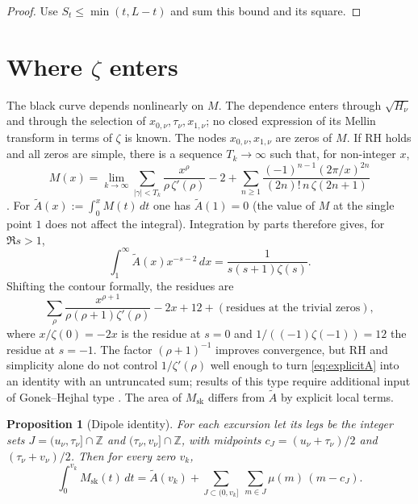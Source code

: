 \documentclass[11pt]{amsart}
\numberwithin{equation}{section}
\theoremstyle{plain}
\newtheorem{proposition}[theorem]{Proposition}
\theoremstyle{definition}
\theoremstyle{remark}
\newcommand{\Msk}{M_{\mathrm{sk}}}
\begin{document}
\begin{proof}
Use $S_t\le\min(t,L-t)$ and sum this bound and its square.
\end{proof}

\section{Where \texorpdfstring{$\zeta$}{zeta} enters}
\label{sec:zeta}

The black curve depends nonlinearly on $M$. The dependence enters through
$\sqrt{H_\nu}$ and through the selection of
$x_{0,\nu},\tau_\nu,x_{1,\nu}$; no closed expression of its Mellin transform
in terms of $\zeta$ is known. The nodes
$x_{0,\nu},x_{1,\nu}$ are zeros of $M$. If RH holds and all zeros are
simple, there is a sequence $T_k\to\infty$ such that, for non-integer $x$,
\begin{equation}
\label{eq:explicitM}
  M(x)=\lim_{k\to\infty}\sum_{|\gamma|<T_k}\frac{x^\rho}{\rho\,\zeta'(\rho)}-2
  +\sum_{n\ge1}\frac{(-1)^{n-1}(2\pi/x)^{2n}}{(2n)!\,n\,\zeta(2n+1)}
\end{equation}
\cite[\S14.27]{Titchmarsh1986}. For $\widetilde{A}(x):=\int_0^xM(t)\,dt$ one has
$\widetilde A(1)=0$ (the value of $M$ at the single point $1$ does not
affect the integral).  Integration by parts therefore gives, for
$\Re s>1$,
\begin{equation}
\label{eq:mellin_A}
  \int_1^\infty \widetilde{A}(x)x^{-s-2}\,dx=\frac{1}{s(s+1)\zeta(s)}.
\end{equation}
Shifting the contour formally, the residues are
\begin{equation}
\label{eq:explicitA}
  \sum_\rho\frac{x^{\rho+1}}{\rho(\rho+1)\zeta'(\rho)}-2x+12
  +(\text{residues at the trivial zeros}),
\end{equation}
where $x/\zeta(0)=-2x$ is the residue at $s=0$ and
$1/((-1)\zeta(-1))=12$ the residue at $s=-1$. The factor $(\rho+1)^{-1}$
improves convergence, but RH and simplicity alone do not control
$1/\zeta'(\rho)$ well enough to turn \eqref{eq:explicitA} into an identity
with an untruncated sum; results of this type require additional input of
Gonek--Hejhal type \cite{Ng2004}. The area of $\Msk$ differs from
$\widetilde A$ by explicit local terms.

\begin{proposition}[Dipole identity]
\label{prop:dipoles}
For each excursion let its \emph{legs} be the integer sets
$J=(u_\nu,\tau_\nu]\cap\mathbb{Z}$ and
$(\tau_\nu,v_\nu]\cap\mathbb{Z}$, with midpoints $c_J=(u_\nu+\tau_\nu)/2$
and $(\tau_\nu+v_\nu)/2$. Then for every zero $v_k$,
\begin{equation}
\label{eq:dipoles}
  \int_0^{v_k}\Msk(t)\,dt=\widetilde{A}(v_k)
  +\sum_{J\subset(0,v_k]}\ \sum_{m\in J}\mu(m)\,(m-c_J).
\end{equation}
\end{proposition}
\end{document}
